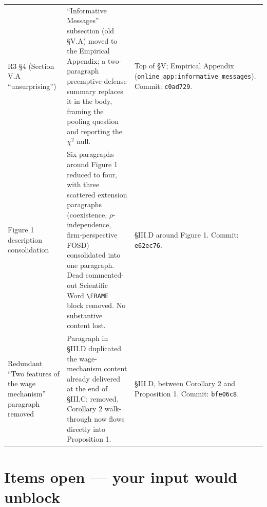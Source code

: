 \documentclass[11pt]{article}
\begin{document}
\begin{longtable}{L{3.2cm} L{7.5cm} L{4.5cm}}
R3 \S4 (Section V.A ``unsurprising'') & ``Informative Messages'' subsection (old \S V.A) moved to the Empirical Appendix; a two-paragraph preemptive-defense summary replaces it in the body, framing the pooling question and reporting the $\chi^2$ null. & Top of \S V; Empirical Appendix (\texttt{online\_app:informative\_messages}). Commit: \texttt{c0ad729}. \\
\addlinespace

Figure 1 description consolidation & Six paragraphs around Figure 1 reduced to four, with three scattered extension paragraphs (coexistence, $\rho$-independence, firm-perspective FOSD) consolidated into one paragraph. Dead commented-out Scientific Word \texttt{\textbackslash FRAME} block removed. No substantive content lost. & \S III.D around Figure 1. Commit: \texttt{e62ec76}. \\
\addlinespace

Redundant ``Two features of the wage mechanism'' paragraph removed & Paragraph in \S III.D duplicated the wage-mechanism content already delivered at the end of \S III.C; removed. Corollary 2 walk-through now flows directly into Proposition 1. & \S III.D, between Corollary 2 and Proposition 1. Commit: \texttt{bfe06c8}. \\

\bottomrule
\end{longtable}

\section*{Items open --- your input would unblock}
\end{document}
